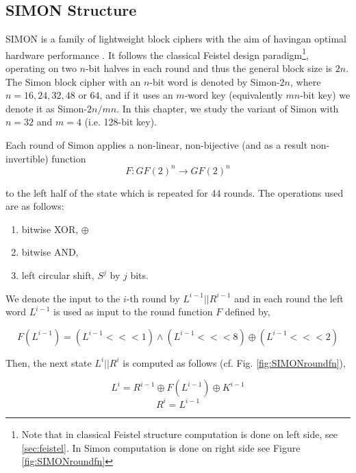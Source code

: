 \subsection{SIMON Structure}
SIMON is a family of lightweight block ciphers with the aim of havingan  optimal hardware performance \cite{NSAciphers}.
It follows the classical Feistel design paradigm\footnote{Note that in classical Feistel structure computation is done on left side, see \ref{sec:feistel}. In Simon computation is done on right side see Figure \ref{fig:SIMONroundfn}}, operating on two
$n$-bit halves in each round and thus the general block size is $2n$.
The Simon block cipher with an $n$-bit word is denoted by Simon-$2n$, where
$n=16,24,32,48$ or $64$, and if it uses an $m$-word key (equivalently $mn$-bit
key) we denote it as Simon-$2n/mn$. In this chapter, we study the variant of
Simon with $n=32$ and $m=4$ (i.e. 128-bit key).

Each round of Simon applies a non-linear, non-bijective (and as a result
non-invertible) function
\begin{equation}
F:GF(2)^n\rightarrow GF(2)^n
\end{equation}

to the left half of the state which is repeated for 44 rounds.
The operations used are as follows:

\begin{enumerate}
	\item bitwise XOR, $\oplus$
	\item bitwise AND,
	\item left circular shift, $S^j$ by $j$ bits.
\end{enumerate}

We denote the input to the $i$-th round by $L^{i-1}||R^{i-1}$
and in each round the left word $L^{i-1}$ is used as input
to the round function $F$ defined by,

\begin{equation}
F(L^{i-1})=(L^{i-1}<<<1)\wedge(L^{i-1}<<<8)\oplus(L^{i-1}<<<2)
\end{equation}

Then, the next state $L^{i}||R^{i}$ is computed as follows
(cf. Fig. \ref{fig:SIMONroundfn}),

\begin{equation}
L^i=R^{i-1}\oplus F(L^{i-1})\oplus K^{i-1}
\end{equation}
\begin{equation}
R^i=L^{i-1}
\end{equation}


